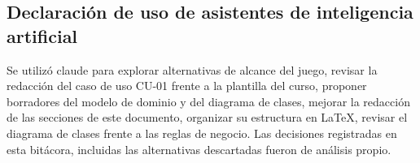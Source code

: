 \subsection{Declaración de uso de asistentes de inteligencia artificial}

Se utilizó claude para explorar alternativas de alcance del juego, revisar la redacción del caso de uso CU-01 frente a la plantilla del curso, proponer borradores del modelo de dominio y del diagrama de clases, mejorar la redacción de las secciones de este documento, organizar su estructura en LaTeX, revisar el diagrama de clases frente a las reglas de negocio. Las decisiones registradas en esta bitácora, incluidas las alternativas descartadas fueron de análisis propio.
